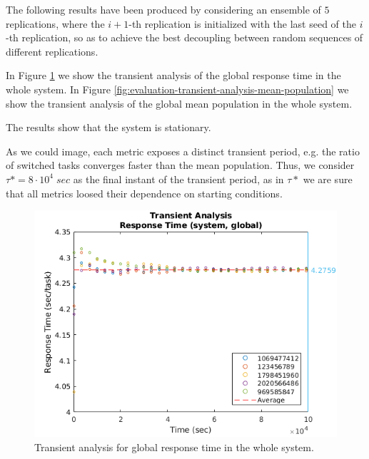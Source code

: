 The following results have been produced by considering an ensemble of $5$ replications, where the $i+1$-th replication is initialized with the last seed of the $i$-th replication, so as to achieve the best decoupling between random sequences of different replications.

In Figure \ref{fig:evaluation-transient-analysis-response-time} we show the transient analysis of the global response time in the whole system.
%
In Figure \ref{fig:evaluation-transient-analysis-mean-population} we show the transient analysis of the global mean population in the whole system.

The results show that the system is stationary.

As we could image, each metric exposes a distinct transient period, e.g. the ratio of switched tasks converges faster than the mean population. Thus, we consider $\tau*=8\cdot 10^{4}\;sec$ as the final instant of the transient period, as in $\tau*$ we are sure that all metrics loosed their dependence on starting conditions.

\begin{figure}
	\includegraphics[width=\columnwidth]{fig/evaluation-transient-analysis-response-time}
	\caption{Transient analysis for global response time in the whole system.}
	\label{fig:evaluation-transient-analysis-response-time}
\end{figure}


